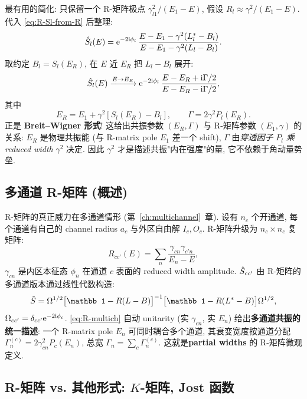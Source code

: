 最有用的简化: 只保留一个 R-矩阵极点 $\gamma_{l1}^2/(E_1-E)$, 假设 $R_l\approx \gamma^2/(E_1-E)$. 代入 \eqref{eq:R-Sl-from-R} 后整理:
\begin{equation}
  \hat{S}_l(E)=\mathrm{e}^{-2\mathrm{i}\phi_l}\,\frac{E-E_1-\gamma^2(L_l^*-B_l)}{E-E_1-\gamma^2(L_l-B_l)}.
  \label{eq:R-singlepole}
\end{equation}
取约定 $B_l=S_l(E_R)$, 在 $E$ 近 $E_R$ 把 $L_l-B_l$ 展开:
\begin{equation}
  \hat{S}_l(E)\xrightarrow{E\to E_R}\mathrm{e}^{-2\mathrm{i}\phi_l}\,\frac{E-E_R+\mathrm{i}\Gamma/2}{E-E_R-\mathrm{i}\Gamma/2},
\end{equation}
其中
\begin{equation}
  E_R=E_1+\gamma^2[S_l(E_R)-B_l],\qquad
  \Gamma=2\gamma^2 P_l(E_R).
  \label{eq:R-BW-from-Rpole}
\end{equation}
正是 \textbf{Breit--Wigner 形式}! 这给出共振参数 $(E_R,\Gamma)$ 与 R-矩阵参数 $(E_1,\gamma)$ 的关系: $E_R$ 是物理共振能 (与 R-matrix pole $E_1$ 差一个 shift), $\Gamma$ 由\emph{穿透因子} $P_l$ \emph{乘}\emph{reduced width} $\gamma^2$ 决定. 因此 $\gamma^2$ 才是描述共振"内在强度"的量, 它不依赖于角动量势垒.

\subsection{多通道 R-矩阵 (概述)}\label{sec:Rmatrix-multi}

R-矩阵的真正威力在多通道情形 (第~\ref{ch:multichannel}~章). 设有 $n_c$ 个开通道, 每个通道有自己的 channel radius $a_c$ 与外区自由解 $I_c, O_c$. R-矩阵升级为 $n_c\times n_c$ 复矩阵:
\begin{equation}
  R_{cc'}(E)=\sum_n\frac{\gamma_{cn}\gamma_{c'n}}{E_n-E},
  \label{eq:R-multich}
\end{equation}
$\gamma_{cn}$ 是内区本征态 $\phi_n$ 在通道 $c$ 表面的 reduced width amplitude. $\hat{S}_{cc'}$ 由 R-矩阵的多通道版本通过线性代数构造:
\begin{equation}
  \Smat=\Omega^{1/2}\bigl[\mathbb 1-R(L-B)\bigr]^{-1}\bigl[\mathbb 1-R(L^*-B)\bigr]\Omega^{1/2},
\end{equation}
$\Omega_{cc'}=\delta_{cc'}\mathrm{e}^{-2\mathrm{i}\phi_c}$. \eqref{eq:R-multich} 自动 unitarity (实 $\gamma_{cn}$, 实 $E_n$) 给出\textbf{多通道共振的统一描述}: 一个 R-matrix pole $E_n$ 可同时耦合多个通道, 其衰变宽度按通道分配 $\Gamma_n^{(c)}=2\gamma_{cn}^2 P_c(E_n)$, 总宽 $\Gamma_n=\sum_c\Gamma_n^{(c)}$. 这就是\textbf{partial widths} 的 R-矩阵微观定义.

\subsection{R-矩阵 vs. 其他形式: $K$-矩阵, Jost 函数}\label{sec:Rmatrix-vs}


